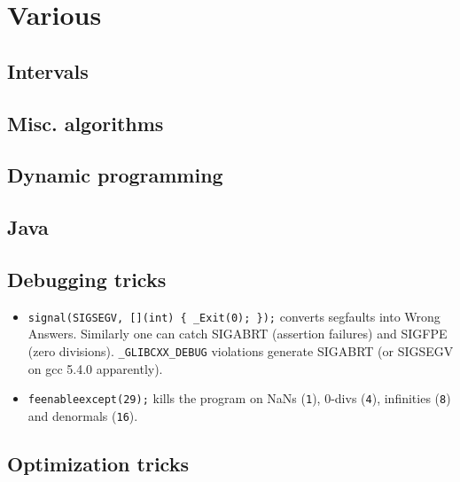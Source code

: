 \chapter{Various}

\section{Intervals}

\section{Misc. algorithms}

\section{Dynamic programming}

\section{Java}

\section{Debugging tricks}
	\begin{itemize}
		\item \texttt{signal(SIGSEGV, [](int) \{ \_Exit(0); \});} converts segfaults into Wrong Answers.
			Similarly one can catch SIGABRT (assertion failures) and SIGFPE (zero divisions).
			\texttt{\_GLIBCXX\_DEBUG} violations generate SIGABRT (or SIGSEGV on gcc 5.4.0 apparently).
		\item \texttt{feenableexcept(29);} kills the program on NaNs (\texttt 1), 0-divs (\texttt 4), infinities (\texttt 8) and denormals (\texttt{16}).
	\end{itemize}

\section{Optimization tricks}

